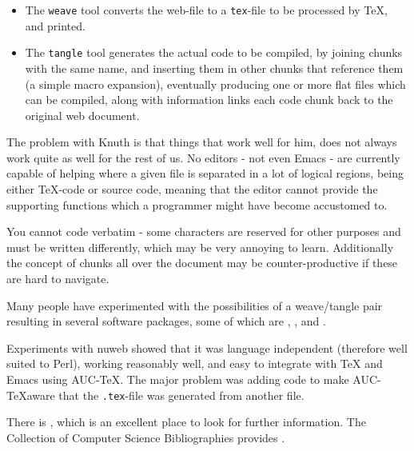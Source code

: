 \begin{itemize}
\item
The \texttt{weave} tool converts the web-file to a \texttt{tex}-file
to be processed by {\TeX}, and printed.

\item The \texttt{tangle} tool generates the actual code to be
compiled, by joining chunks with the same name, and inserting them in
other chunks that reference them (a simple macro expansion),
eventually producing one or more flat files which can be compiled,
along with information links each code chunk back to the original web document.

\end{itemize}
The problem with Knuth is that things that work well for him, does not
always work quite as well for the rest of us.  No editors - not even
Emacs - are currently capable of helping where a given file is
separated in a lot of logical regions, being either {\TeX}-code or
source code, meaning that the editor cannot provide the supporting
functions which a programmer might have become accustomed to.

You cannot code verbatim - some characters are reserved for other
purposes and must be written differently, which may be very annoying
to learn.  Additionally the concept of chunks all over the document
may be counter-productive if these are hard to navigate.

Many people have experimented with the possibilities of a weave/tangle
pair resulting in several software packages, some of which are
,
,
 and
.

Experiments with nuweb showed that it was language
independent (therefore well suited to Perl), working
reasonably well, and easy to integrate with {\TeX} and Emacs
using AUC-\TeX.  The major problem was adding code to make
AUC-\TeX aware that the \texttt{.tex}-file was generated
from another file.

There is
, which is an excellent place to
look for further information.  The Collection of Computer Science
Bibliographies provides
.

